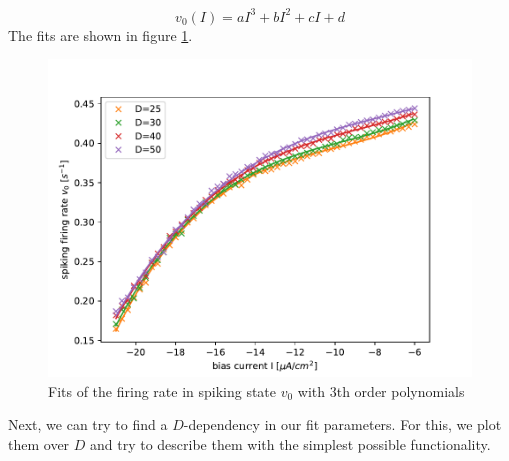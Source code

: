 \documentclass[12pt,a4paper]{article}
\begin{document}
\begin{equation}
v_0(I)=aI^3+bI^2+cI+d
\end{equation}
The fits are shown in figure \ref{detmocompfit}.
\begin{figure}[H]
	\centering
	\includegraphics[scale=1]{detmocountrinzelcomp6.pdf}\caption{Fits of the firing rate in spiking state $v_0$ with 3th order polynomials}
	\label{detmocompfit}
\end{figure}
Next, we can try to find a $D$-dependency in our fit parameters. For this, we plot them over $D$ and try to describe them with the simplest possible functionality.
\end{document}
